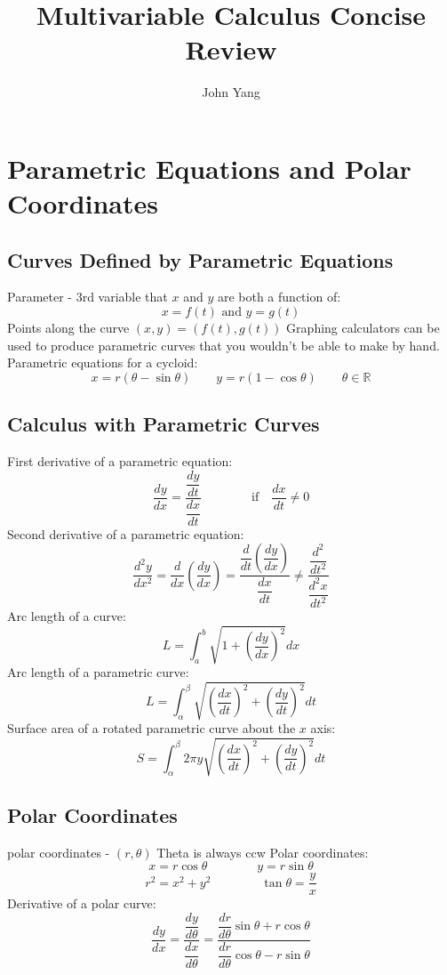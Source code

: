 \documentclass{article}
\title{Multivariable Calculus Concise Review} %
\author{John Yang}
\begin{document}
    \maketitle
    \tableofcontents\newpage
    
    \section{Parametric Equations and Polar Coordinates} %
    
    \subsection{Curves Defined by Parametric Equations} %
    \begin{outline}
        \1 Parameter - 3rd variable that $x$ and $y$ are both a function of: \[x=f(t)\text{ and }y=g(t)\]
        \1 Points along the curve \((x,y)=(f(t),g(t))\)
        \1 Graphing calculators can be used to produce parametric curves that you wouldn't be able to make by hand. 
        \1 Parametric equations for a cycloid: \[x=r(\theta-\sin\theta) \qquad y=r(1-\cos\theta) \qquad \theta\in\mathbb{R}\]
    \end{outline}
    \subsection{Calculus with Parametric Curves}
    \begin{outline}
        \1 First derivative of a parametric equation: \[\dfrac{dy}{dx}=\dfrac{\dfrac{dy}{dt}}{\dfrac{dx}{dt}}\qquad\qquad\text{if}\quad\dfrac{dx}{dt}\neq0\]
        \1 Second derivative of a parametric equation: \[\dfrac{d^2y}{dx^2}=\dfrac{d}{dx}\left(\dfrac{dy}{dx}\right)=\dfrac{\dfrac{d}{dt}\left(\dfrac{dy}{dx}\right)}{\dfrac{dx}{dt}}\neq\dfrac{\dfrac{d^2}{dt^2}}{\dfrac{d^2x}{dt^2}}\]
        \1 Arc length of a curve: \[L=\int^b_a\sqrt{1+\left(\dfrac{dy}{dx}\right)^2}dx\]
        \1 Arc length of a parametric curve: \[L=\int^\beta_\alpha\sqrt{\left(\dfrac{dx}{dt}\right)^2+\left(\dfrac{dy}{dt}\right)^2}dt\]
        \1 Surface area of a rotated parametric curve about the $x$ axis: \[S=\int^\beta_\alpha2\pi y\sqrt{\left(\dfrac{dx}{dt}\right)^2+\left(\dfrac{dy}{dt}\right)^2}dt\]

    \end{outline}
    \subsection{Polar Coordinates}
    \begin{outline}
        \1 polar coordinates - \((r,\theta)\)
        \1 Theta is always ccw 
        \1 Polar coordinates: \[x=r\cos\theta\qquad\qquad y=r\sin\theta\]\[r^2=x^2+y^2\qquad\qquad\tan\theta=\dfrac{y}{x}\]
        \1 Derivative of a polar curve: \[\dfrac{dy}{dx}=\dfrac{\dfrac{dy}{d\theta}}{\dfrac{dx}{d\theta}}=\dfrac{\dfrac{dr}{d\theta}\sin\theta+r\cos\theta}{\dfrac{dr}{d\theta}\cos\theta-r\sin\theta}\]
    \end{outline}
\end{document}
